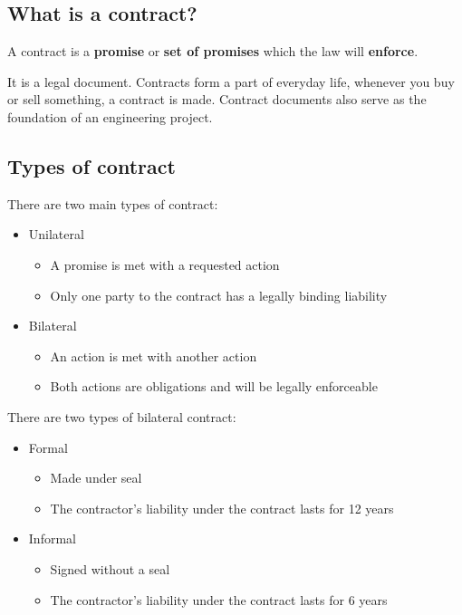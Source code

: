 \subsection{What is a contract?}
\begin{quoting}
    A contract is a \textbf{promise} or \textbf{set of promises} which the law will \textbf{enforce}.
\end{quoting}
It is a legal document. Contracts form a part of everyday life, whenever you buy or sell something, a contract is made. Contract documents also serve as the foundation of an engineering project.
\subsection{Types of contract}
There are two main types of contract:
\begin{itemize}
    \item Unilateral
          \begin{itemize}
              \item A promise is met with a requested action
              \item Only one party to the contract has a legally binding liability
          \end{itemize}
    \item Bilateral
          \begin{itemize}
              \item An action is met with another action
              \item Both actions are obligations and will be legally enforceable
          \end{itemize}
\end{itemize}
There are two types of bilateral contract:
\begin{itemize}
    \item Formal
          \begin{itemize}
              \item Made under seal
              \item The contractor's liability under the contract lasts for 12 years
          \end{itemize}
    \item Informal
          \begin{itemize}
              \item Signed without a seal
              \item The contractor's liability under the contract lasts for 6 years
          \end{itemize}
\end{itemize}
